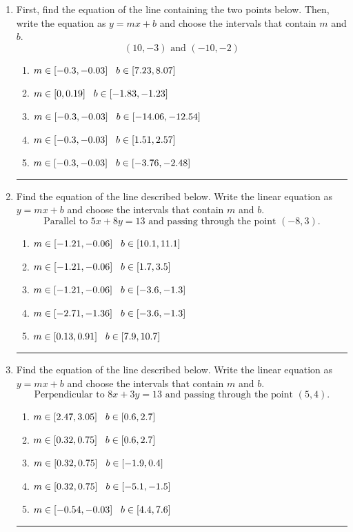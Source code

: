 \documentclass[14pt]{extbook}
\newcommand{\litem}[1]{\item#1\hspace*{-1cm}\rule{\textwidth}{0.4pt}}
\begin{document}
\begin{enumerate}
\litem{
First, find the equation of the line containing the two points below. Then, write the equation as $ y=mx+b $ and choose the intervals that contain $m$ and $b$.\[ (10, -3) \text{ and } (-10, -2) \]\begin{enumerate}[label=\Alph*.]
\item \( m \in [-0.3, -0.03] \hspace*{3mm} b \in [7.23, 8.07] \)
\item \( m \in [0, 0.19] \hspace*{3mm} b \in [-1.83, -1.23] \)
\item \( m \in [-0.3, -0.03] \hspace*{3mm} b \in [-14.06, -12.54] \)
\item \( m \in [-0.3, -0.03] \hspace*{3mm} b \in [1.51, 2.57] \)
\item \( m \in [-0.3, -0.03] \hspace*{3mm} b \in [-3.76, -2.48] \)

\end{enumerate} }
\litem{
Find the equation of the line described below. Write the linear equation as $ y=mx+b $ and choose the intervals that contain $m$ and $b$.\[ \text{Parallel to } 5 x + 8 y = 13 \text{ and passing through the point } (-8, 3). \]\begin{enumerate}[label=\Alph*.]
\item \( m \in [-1.21, -0.06] \hspace*{3mm} b \in [10.1, 11.1] \)
\item \( m \in [-1.21, -0.06] \hspace*{3mm} b \in [1.7, 3.5] \)
\item \( m \in [-1.21, -0.06] \hspace*{3mm} b \in [-3.6, -1.3] \)
\item \( m \in [-2.71, -1.36] \hspace*{3mm} b \in [-3.6, -1.3] \)
\item \( m \in [0.13, 0.91] \hspace*{3mm} b \in [7.9, 10.7] \)

\end{enumerate} }
\litem{
Find the equation of the line described below. Write the linear equation as $ y=mx+b $ and choose the intervals that contain $m$ and $b$.\[ \text{Perpendicular to } 8 x + 3 y = 13 \text{ and passing through the point } (5, 4). \]\begin{enumerate}[label=\Alph*.]
\item \( m \in [2.47, 3.05] \hspace*{3mm} b \in [0.6, 2.7] \)
\item \( m \in [0.32, 0.75] \hspace*{3mm} b \in [0.6, 2.7] \)
\item \( m \in [0.32, 0.75] \hspace*{3mm} b \in [-1.9, 0.4] \)
\item \( m \in [0.32, 0.75] \hspace*{3mm} b \in [-5.1, -1.5] \)
\item \( m \in [-0.54, -0.03] \hspace*{3mm} b \in [4.4, 7.6] \)


\end{enumerate}}
\end{enumerate}
\end{document}
